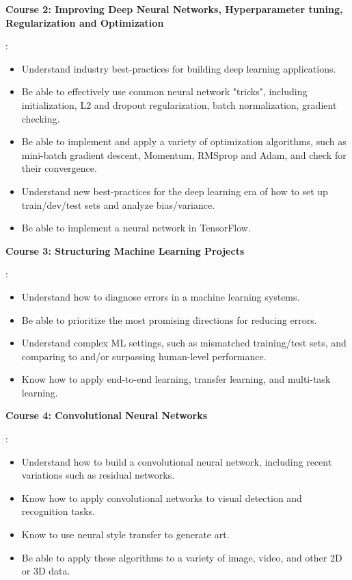 \documentclass[letterpaper,11pt]{article}
\newcommand{\resumeItem}[2]{
  \item\small{
    \textbf{#1}{: #2 \vspace{-2pt}}
  }
}
\begin{document}
      	\resumeItem{Course 2: Improving Deep Neural Networks, Hyperparameter tuning, Regularization and Optimization}{
			\begin{itemize}
				\item Understand industry best-practices for building deep learning applications.
				\item Be able to effectively use common neural network "tricks", including initialization, L2 and dropout regularization, batch normalization, gradient checking.
				\item Be able to implement and apply a variety of optimization algorithms, such as mini-batch gradient descent, Momentum, RMSprop and Adam, and check for their convergence. 
				\item Understand new best-practices for the deep learning era of how to set up train/dev/test sets and analyze bias/variance.
				\item Be able to implement a neural network in TensorFlow. 
			\end{itemize}
		}

		\resumeItem{Course 3: Structuring Machine Learning Projects}{
			\begin{itemize}
				\item Understand how to diagnose errors in a machine learning systems. 
				\item Be able to prioritize the most promising directions for reducing errors.
				\item Understand complex ML settings, such as mismatched training/test sets, and comparing to and/or surpassing human-level performance.
				\item Know how to apply end-to-end learning, transfer learning, and multi-task learning.
			\end{itemize}
		}
		
		\resumeItem{Course 4: Convolutional Neural Networks}{
			\begin{itemize}
				\item Understand how to build a convolutional neural network, including recent variations such as residual networks.
				\item Know how to apply convolutional networks to visual detection and recognition tasks.
				\item Know to use neural style transfer to generate art.
				\item Be able to apply these algorithms to a variety of image, video, and other 2D or 3D data.
			\end{itemize}
		}
		
\end{document}
